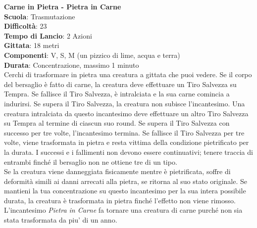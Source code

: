 \begin{multicols}{2}
\medskip\textbf{Carne in Pietra - Pietra in Carne}\\
\textbf{Scuola}: Trasmutazione\\
\textbf{Difficoltà}: 23\\
\textbf{Tempo di Lancio}: 2 Azioni\\
\textbf{Gittata}: 18 metri\\
\textbf{Componenti}: V, S, M (un pizzico di lime, acqua e terra)\\
\textbf{Durata}: Concentrazione, massimo 1 minuto\\
Cerchi di trasformare in pietra una creatura a gittata che puoi vedere. Se il corpo del bersaglio è fatto di carne, la creatura deve effettuare un Tiro Salvezza su Tempra. Se fallisce il Tiro Salvezza, è intralciata e la sua carne comincia a indurirsi. Se supera il Tiro Salvezza, la creatura non subisce l'incantesimo. Una creatura intralciata da questo incantesimo deve effettuare un altro Tiro Salvezza su Tempra al termine di ciascun suo round. Se supera il Tiro Salvezza con successo per tre volte, l'incantesimo termina. Se fallisce il Tiro Salvezza per tre volte, viene trasformata in pietra e resta vittima della condizione pietrificato per la durata. I successi e i fallimenti non devono essere continuativi; tenere traccia di entrambi finché il bersaglio non ne ottiene tre di un tipo.\\
Se la creatura viene danneggiata fisicamente mentre è pietrificata, soffre di deformità simili ai danni arrecati alla pietra, se ritorna al suo stato originale. Se mantieni la tua concentrazione su questo incantesimo per la sua intera possibile durata, la creatura è trasformata in pietra finché l'effetto non viene rimosso.\\
L'incantesimo \emph{Pietra in Carne} fa tornare una creatura di carne purché non sia stata trasformata da piu' di un anno.\\



\end{multicols}
